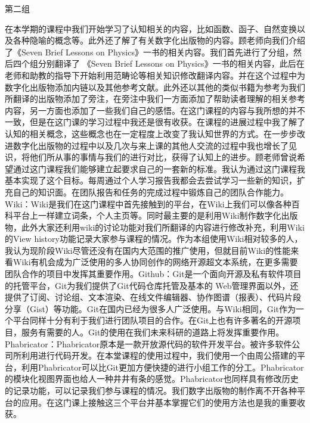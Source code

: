\documentclass[11pt,fleqn]{book}
\makeatletter
\numberwithin{dummy}{section}
\theoremstyle{ocrenumbox}
\theoremstyle{blacknumex}
\theoremstyle{blacknumbox}
\theoremstyle{ocrenum}
\newenvironment{remark}[1]{\par\vspace{10pt}\small %
	\begin{list}{}{
			\leftmargin=35pt %
			\rightmargin=25pt}\item\ignorespaces %
		\makebox[-2.5pt]{\begin{tikzpicture}[overlay]
			\node[draw=ocre!60,line width=1pt,circle,fill=ocre!25,font=\sffamily\bfseries,inner sep=2pt,outer sep=0pt] at (-15pt,0pt){\textcolor{ocre}{#1}};\end{tikzpicture}} %
		\advance\baselineskip -1pt}{\end{list}\vskip5pt} %
\renewcommand{\subsection}{\@startsection {subsection}{2}{\z@}
	{-3ex \@plus -0.1ex \@minus -.4ex}
	{0.5ex \@plus.2ex }
	{\normalfont\sffamily\bfseries}}
\newlength\esp
\makeatother
\begin{document}
\subsection{第二组}

\begin{remark}{朱}
	在本学期的课程中我们开始学习了认知相关的内容，比如函数、函子、自然变换以及各种隐喻的概念等。此外还了解了有关数字化出版物的内容。顾老师向我们介绍了《Seven Brief Lessons on Physics》一书的相关内容。我们首先进行了分组，然后四个组分别翻译了 《Seven Brief Lessons on Physics》一书的相关内容，此后在老师和助教的指导下开始利用范畴论等相关知识修改翻译内容。并在这个过程中为数字化出版物添加内链以及其他参考文献。此外还以其他的类似书籍为参考为我们所翻译的出版物添加了旁注，在旁注中我们一方面添加了帮助读者理解的相关参考内容，另一方面也添加了一些我们自己的感悟。在这门课程的内容与我所想的并不一致，但是在这门课的学习过程中我还是很有收获。在课程的进展过程中我了解了认知的相关概念，这些概念也在一定程度上改变了我认知世界的方式。在一步步改进数字化出版物的过程中以及几次与来上课的其他人交流的过程中我也增长了见识，将他们所从事的事情与我们的进行对比，获得了认知上的进步。顾老师曾说希望通过这门课程我们能够建立起要求自己的一套新的标准。我认为通过这门课程我基本实现了这个目标。每周通过个人学习报告我都会去尝试学习一些新的知识，扩充自己的知识面。在团队报告和任务的完成过程中锻炼自己的团队合作能力。Wiki：Wiki是我们在这门课程中首先接触到的平台，在Wiki上我们可以像各种百科平台上一样建立词条，个人主页等。同时最主要的是利用Wiki制作数字化出版物，此外大家还利用wiki的讨论功能对我们所翻译的内容进行修改补充，利用Wiki的View history功能记录大家参与课程的情况。作为本组使用Wiki相对较多的人，我认为现阶段Wiki尽管还没有在国内大范围的推广使用，但就目前Wiki的性能来看Wiki有机会成为广泛使用的多人协同创作的网络开源超文本系统，在更多需要团队合作的项目中发挥其重要作用。Github：Git是一个面向开源及私有软件项目的托管平台，Git为我们提供了Git代码仓库托管及基本的 Web管理界面以外，还提供了订阅、讨论组、文本渲染、在线文件编辑器、协作图谱（报表）、代码片段分享（Gist）等功能。Git在国内已经为很多人广泛使用。与Wiki相同，Git作为一个平台同样十分有利于我们进行团队项目的合作。在Git上也有许多著名的开源项目，服务有需要的人。Git的使用在我们未来科研的道路上将发挥重要作用。Phabricator：Phabricator原本是一款开放源代码的软件开发平台。被许多软件公司所利用进行代码开发。在本堂课程的使用过程中，我们使用一个由周公搭建的平台，利用Phabricator可以比Git更加方便快捷的进行小组工作的分工。Phabricator的模块化视图界面也给人一种井井有条的感觉。Phabricator也同样具有修改历史的记录功能，可以记录我们参与课程的情况。我们数字出版物的制作离不开各种平台的应用。在这门课上接触这三个平台并基本掌握它们的使用方法也是我的重要收获。
\end{remark}
\end{document}
